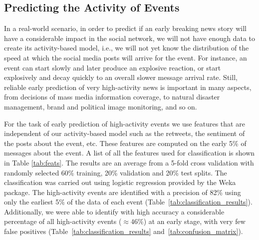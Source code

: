 
\subsection{Predicting the Activity of Events}

In a real-world scenario, in order to predict if an early breaking news story
will have a considerable impact in the social network, we will not have enough
data to create its activity-based model, i.e., we will not yet know the
distribution of the speed at which the social media posts will arrive for the
event. 
%
For instance, an event can start slowly and later produce an explosive reaction,
or start explosively and decay quickly to an overall slower message arrival
rate. 
%
Still, reliable early prediction of very high-activity news is important in many
aspects, from decisions of mass media information coverage, to natural disaster
management, brand and political image monitoring, and so on.


For the task of early prediction of high-activity events we use features that
are independent of our activity-based model such as the retweets, the sentiment
of the posts about the event, etc. These features are computed on the early 5\%
of messages about the event.
%
A list of all the features used for classification is shown in Table
\ref{tab:feats}.
%
The results are an average from a 5-fold cross validation with randomly selected
60\% training, 20\% validation and 20\% test splits.
%
The classification was carried out using logistic regression provided by the Weka
package.
%
The high-activity events are identified with a precision of 82\% using only the
earliest 5\% of the data of each event (Table~\ref{tab:classification_results}).
%
Additionally, we were able to identify with high accuracy a considerable
percentage of all high-activity events ($\approx 46\%$) at an early stage, with
very few false positives (Table~\ref{tab:classification_results}
and~\ref{tab:confusion_matrix}).

